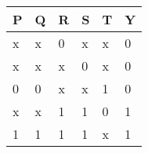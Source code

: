 \begin{tabular}{|p{0.75cm}|p{0.75cm}|p{0.75cm}|p{0.75cm}|p{0.75cm}|p{0.75cm}|}                            
\hline            
P& Q& R& S& T& Y\\       
\hline          
x& x& 0& x& x& 0\\              
\hline       
x& x& x& 0& x& 0\\               
\hline                                          
0& 0& x& x& 1& 0\\                       
\hline                         
x& x& 1& 1& 0& 1\\                    
\hline     
1& 1& 1& 1& x& 1\\           
\hline                                      
\end{tabular}
